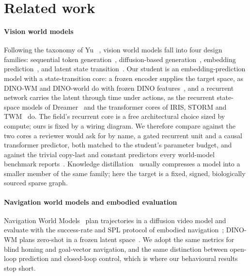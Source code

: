 \section{Related work}
\label{sec:related}

\paragraph{Vision world models}
Following the taxonomy of Yu \etal~\cite{yu2026seeing}, vision world models fall into four design families: sequential
token generation~\cite{bruce2024genie}, diffusion-based generation~\cite{agarwal2025cosmos,bar2024nwm}, embedding
prediction~\cite{lecun2022path,bardes2024vjepa,assran2025vjepa2,zhou2024dinowm,baldassarre2025dinoworld}, and latent
state transition~\cite{ha2018world,hafner2023dreamerv3,micheli2023iris,zhang2023storm,robine2023twm}. Our student is an
embedding-prediction model with a state-transition core: a frozen \vjepa encoder supplies the target space, as DINO-WM
and DINO-world do with frozen DINO features~\cite{zhou2024dinowm,baldassarre2025dinoworld}, and a recurrent network
carries the latent through time under actions, as the recurrent state-space models of Dreamer~\cite{hafner2023dreamerv3}
and the transformer cores of IRIS, STORM and TWM~\cite{micheli2023iris,zhang2023storm,robine2023twm} do. The field's
recurrent core is a free architectural choice sized by compute; ours is fixed by a wiring diagram. We therefore compare
against the two cores a reviewer would ask for by name, a gated recurrent unit and a causal transformer predictor, both
matched to the student's parameter budget, and against the trivial copy-last and constant predictors every world-model
benchmark reports~\cite{bar2024nwm}. Knowledge distillation~\cite{hinton2015distilling} usually compresses a model into
a smaller member of the same family; here the target is a fixed, signed, biologically sourced sparse graph.

\paragraph{Navigation world models and embodied evaluation}
Navigation World Models~\cite{bar2024nwm} plan trajectories in a diffusion video model and evaluate with the
success-rate and SPL protocol of embodied navigation~\cite{anderson2018evaluation}; DINO-WM plans zero-shot in a frozen
latent space~\cite{zhou2024dinowm}. We adopt the same metrics for blind homing and goal-vector navigation, and the same
distinction between open-loop prediction and closed-loop control, which is where our behavioural results stop short.

